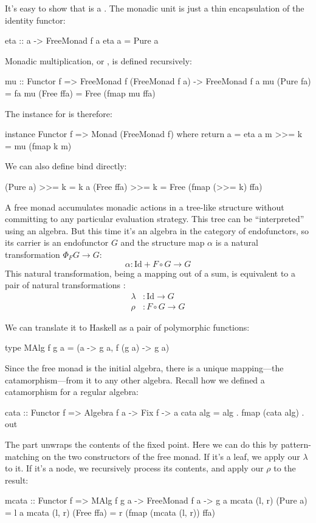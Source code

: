 \documentclass[DaoFP]{subfiles}
\begin{document}
It's easy to show that  is a . The monadic unit  is just a thin encapsulation of the identity functor:
\begin{haskell}
eta :: a -> FreeMonad f a
eta a = Pure a
\end{haskell}

Monadic multiplication, or , is defined recursively:
\begin{haskell}
mu :: Functor f => FreeMonad f (FreeMonad f a) -> FreeMonad f a
mu (Pure fa) = fa
mu (Free ffa) = Free (fmap mu ffa)
\end{haskell}

The  instance for  is therefore:
\begin{haskell}
instance Functor f => Monad (FreeMonad f) where
  return a = eta a
  m >>= k = mu (fmap k m)
\end{haskell}

We can also define bind directly:
\begin{haskell}
  (Pure a)   >>= k = k a
  (Free ffa) >>= k = Free (fmap (>>= k) ffa)
\end{haskell}

A free monad accumulates monadic actions in a tree-like structure without committing to any particular evaluation strategy. This tree can be ``interpreted'' using an algebra. But this time it's an algebra in the category of endofunctors, so its carrier is an endofunctor $G$ and the structure map $\alpha$ is a natural transformation $\Phi_F G \to G$:
\[ \alpha \colon \text{Id} + F \circ G \to G\]
This natural transformation, being a mapping out of a sum, is equivalent to a pair of natural transformations :
\begin{align*}
\lambda &\colon \text{Id} \to G
\\
\rho &\colon F \circ G \to G
\end{align*}

We can translate it to Haskell as a pair of polymorphic functions:
\begin{haskell}
type MAlg f g a = (a -> g a, f (g a) -> g a)
\end{haskell}

Since the free monad is the initial algebra, there is a unique mapping---the catamorphism---from it to any other algebra. Recall how we defined a catamorphism for a regular algebra:
\begin{haskell}
cata :: Functor f => Algebra f a -> Fix f -> a
cata alg = alg . fmap (cata alg) . out
\end{haskell}
The  part unwraps the contents of the fixed point. Here we can do this by pattern-matching on the two constructors of the free monad. If it's a leaf, we apply our $\lambda$ to it. If it's a node, we recursively process its contents, and apply our $\rho$ to the result:
\begin{haskell}
mcata :: Functor f => MAlg f g a -> FreeMonad f a -> g a
mcata (l, r) (Pure a) = l a
mcata (l, r) (Free ffa) = 
  r (fmap (mcata (l, r)) ffa)
\end{haskell}
\end{document}
